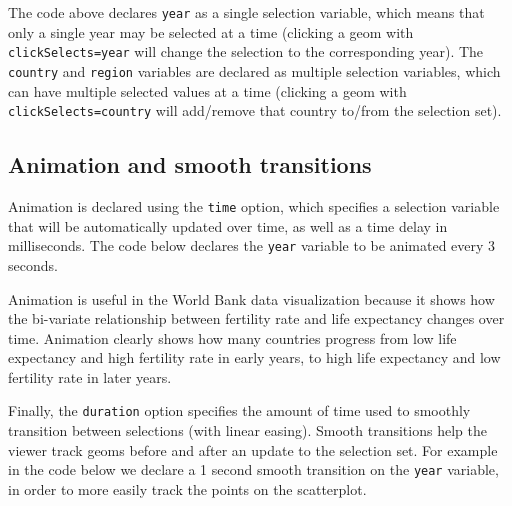 \documentclass[12pt,]{article}
\newenvironment{Shaded}{\begin{snugshade}}{\end{snugshade}}
\newcommand{\DataTypeTok}[1]{\textcolor[rgb]{0.13,0.29,0.53}{#1}}
\newcommand{\DecValTok}[1]{\textcolor[rgb]{0.00,0.00,0.81}{#1}}
\newcommand{\KeywordTok}[1]{\textcolor[rgb]{0.13,0.29,0.53}{\textbf{#1}}}
\newcommand{\NormalTok}[1]{#1}
\newcommand{\OperatorTok}[1]{\textcolor[rgb]{0.81,0.36,0.00}{\textbf{#1}}}
\newcommand{\StringTok}[1]{\textcolor[rgb]{0.31,0.60,0.02}{#1}}
\theoremstyle{definition}
\theoremstyle{definition}
\theoremstyle{definition}
\theoremstyle{remark}
\begin{document}
\begin{Shaded}
\end{Shaded}

The code above declares \texttt{year} as a single selection variable,
which means that only a single year may be selected at a time (clicking
a geom with \texttt{clickSelects=year} will change the selection to the
corresponding year). The \texttt{country} and \texttt{region} variables
are declared as multiple selection variables, which can have multiple
selected values at a time (clicking a geom with
\texttt{clickSelects=country} will add/remove that country to/from the
selection set).

\hypertarget{animation}{%
\subsection{Animation and smooth transitions}\label{animation}}

Animation is declared using the \texttt{time} option, which specifies a
selection variable that will be automatically updated over time, as well
as a time delay in milliseconds. The code below declares the
\texttt{year} variable to be animated every 3 seconds.

\begin{Shaded}
\end{Shaded}

Animation is useful in the World Bank data visualization because it
shows how the bi-variate relationship between fertility rate and life
expectancy changes over time. Animation clearly shows how many countries
progress from low life expectancy and high fertility rate in early
years, to high life expectancy and low fertility rate in later years.

Finally, the \texttt{duration} option specifies the amount of time used
to smoothly transition between selections (with linear easing). Smooth
transitions help the viewer track geoms before and after an update to
the selection set. For example in the code below we declare a 1 second
smooth transition on the \texttt{year} variable, in order to more easily
track the points on the scatterplot.
\end{document}
